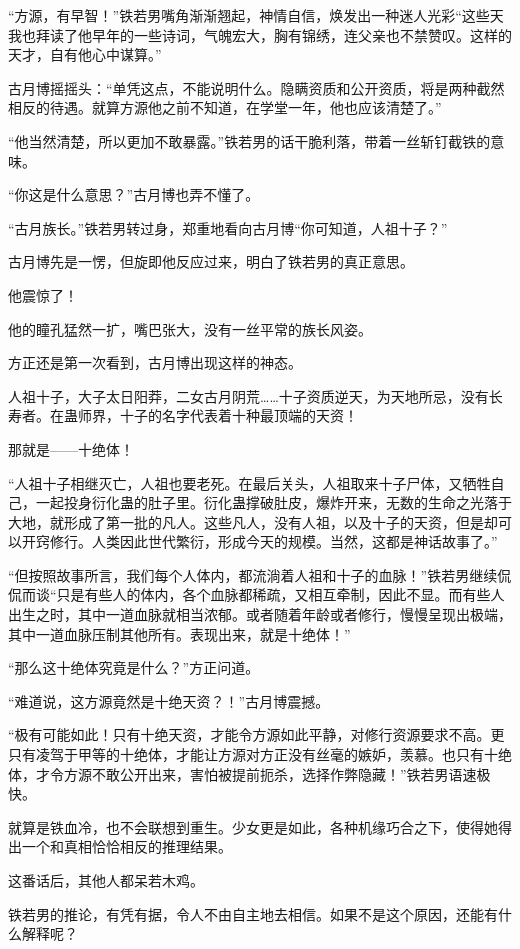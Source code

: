 \begin{this_body}
“方源，有早智！”铁若男嘴角渐渐翘起，神情自信，焕发出一种迷人光彩“这些天我也拜读了他早年的一些诗词，气魄宏大，胸有锦绣，连父亲也不禁赞叹。这样的天才，自有他心中谋算。”

古月博摇摇头：“单凭这点，不能说明什么。隐瞒资质和公开资质，将是两种截然相反的待遇。就算方源他之前不知道，在学堂一年，他也应该清楚了。”

“他当然清楚，所以更加不敢暴露。”铁若男的话干脆利落，带着一丝斩钉截铁的意味。

“你这是什么意思？”古月博也弄不懂了。

“古月族长。”铁若男转过身，郑重地看向古月博“你可知道，人祖十子？”

古月博先是一愣，但旋即他反应过来，明白了铁若男的真正意思。

他震惊了！

他的瞳孔猛然一扩，嘴巴张大，没有一丝平常的族长风姿。

方正还是第一次看到，古月博出现这样的神态。

人祖十子，大子太日阳莽，二女古月阴荒……十子资质逆天，为天地所忌，没有长寿者。在蛊师界，十子的名字代表着十种最顶端的天资！

那就是——十绝体！

“人祖十子相继灭亡，人祖也要老死。在最后关头，人祖取来十子尸体，又牺牲自己，一起投身衍化蛊的肚子里。衍化蛊撑破肚皮，爆炸开来，无数的生命之光落于大地，就形成了第一批的凡人。这些凡人，没有人祖，以及十子的天资，但是却可以开窍修行。人类因此世代繁衍，形成今天的规模。当然，这都是神话故事了。”

“但按照故事所言，我们每个人体内，都流淌着人祖和十子的血脉！”铁若男继续侃侃而谈“只是有些人的体内，各个血脉都稀疏，又相互牵制，因此不显。而有些人出生之时，其中一道血脉就相当浓郁。或者随着年龄或者修行，慢慢呈现出极端，其中一道血脉压制其他所有。表现出来，就是十绝体！”

“那么这十绝体究竟是什么？”方正问道。

“难道说，这方源竟然是十绝天资？！”古月博震撼。

“极有可能如此！只有十绝天资，才能令方源如此平静，对修行资源要求不高。更只有凌驾于甲等的十绝体，才能让方源对方正没有丝毫的嫉妒，羡慕。也只有十绝体，才令方源不敢公开出来，害怕被提前扼杀，选择作弊隐藏！”铁若男语速极快。

就算是铁血冷，也不会联想到重生。少女更是如此，各种机缘巧合之下，使得她得出一个和真相恰恰相反的推理结果。

这番话后，其他人都呆若木鸡。

铁若男的推论，有凭有据，令人不由自主地去相信。如果不是这个原因，还能有什么解释呢？


\end{this_body}
